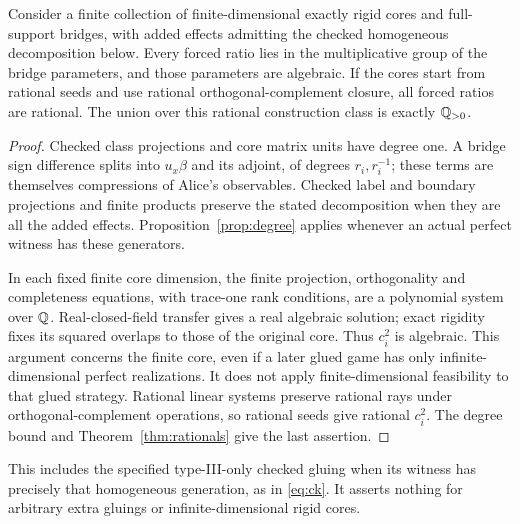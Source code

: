 \begin{corollary}\label{cor:seeds}
Consider a finite collection of finite-dimensional exactly rigid cores and full-support bridges, with added effects admitting the checked homogeneous decomposition below. Every forced ratio lies in the multiplicative group of the bridge parameters, and those parameters are algebraic. If the cores start from rational seeds and use rational orthogonal-complement closure, all forced ratios are rational. The union over this rational construction class is exactly $\mathbb Q_{>0}$.
\end{corollary}
\begin{proof}
Checked class projections and core matrix units have degree one. A bridge sign difference splits into $u_x\beta$ and its adjoint, of degrees $r_i,r_i^{-1}$; these terms are themselves compressions of Alice's observables. Checked label and boundary projections and finite products preserve the stated decomposition when they are all the added effects. Proposition~\ref{prop:degree} applies whenever an actual perfect witness has these generators.

In each fixed finite core dimension, the finite projection, orthogonality and completeness equations, with trace-one rank conditions, are a polynomial system over $\mathbb Q$. Real-closed-field transfer gives a real algebraic solution; exact rigidity fixes its squared overlaps to those of the original core. Thus $c_i^2$ is algebraic. This argument concerns the finite core, even if a later glued game has only infinite-dimensional perfect realizations. It does not apply finite-dimensional feasibility to that glued strategy. Rational linear systems preserve rational rays under orthogonal-complement operations, so rational seeds give rational $c_i^2$. The degree bound and Theorem~\ref{thm:rationals} give the last assertion.
\end{proof}
This includes the specified type-III-only checked gluing when its witness has precisely that homogeneous generation, as in \eqref{eq:ck}. It asserts nothing for arbitrary extra gluings or infinite-dimensional rigid cores.

